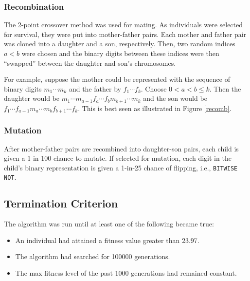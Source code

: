 \documentclass{article}
\begin{document}
    \subsubsection{Recombination}
      The 2-point crossover method was used for mating. As individuals were
      selected for survival, they were put into mother-father pairs. Each
      mother and father pair was cloned into a daughter and a son, respectively.
      Then, two random indices $a<b$ were chosen and the binary digits between
      these indices were then ``swapped'' between the daughter and son's
      chromosomes.

      For example, suppose the mother could be represented with the
      sequence of binary digits $m_1\cdots m_k$ and the father by $f_1\cdots
      f_k$. Choose $0<a<b\leq k$. Then the daughter would be $m_1\cdots m_{a-1}
      f_a\cdots f_bm_{b+1}\cdots m_k$ and the son would be $f_1\cdots f_{a-1}m_a
      \cdots m_bf_{b+1}\cdots f_k$. This is best seen as illustrated in Figure
      \ref{recomb}.
      

    \subsubsection{Mutation}
      After mother-father pairs are recombined into daughter-son pairs, each
      child is given a 1-in-100 chance to mutate. If selected for mutation,
      each digit in the child's binary representation is given a 1-in-25
      chance of flipping, i.e., \texttt{BITWISE NOT}.

  \subsection{Termination Criterion}\label{termination-criterion}
    The algorithm was run until at least one of the following became true:
    \begin{itemize}
      \renewcommand\labelitemi{$\star$}
      \item{
        An individual had attained a fitness value greater than \num{23.97}.
      }
      \item{
        The algorithm had searched for \num{100000} generations.
      }
      \item{
        The max fitness level of the past \num{1000} generations had remained
        constant.
      }
    \end{itemize}
\end{document}
